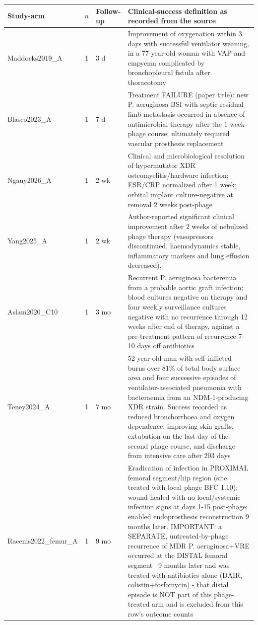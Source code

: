 \begin{tabular}{p{2.6cm}cp{1.5cm}p{8.4cm}}
\toprule
Study-arm & $n$ & Follow-up & Clinical-success definition as recorded from the source \\
\midrule
Maddocks2019\_A & 1 & 3 d & Improvement of oxygenation within 3 days with successful ventilator weaning, in a 77-year-old woman with VAP and empyema complicated by bronchopleural fistula after thoracotomy \\
Blasco2023\_A & 1 & 7 d & Treatment FAILURE (paper title): new P. aeruginosa BSI with septic residual limb metastasis occurred in absence of antimicrobial therapy after the 1-week phage course; ultimately required vascular prosthesis replacement \\
Ngauy2026\_A & 1 & 2 wk & Clinical and microbiological resolution of hypermutator XDR osteomyelitis/hardware infection; ESR/CRP normalized after 1 week; orbital implant culture-negative at removal 2 weeks post-phage \\
Yang2025\_A & 1 & 2 wk & Author-reported significant clinical improvement after 2 weeks of nebulized phage therapy (vasopressors discontinued, haemodynamics stable, inflammatory markers and lung effusion decreased). \\
Aslam2020\_C10 & 1 & 3 mo & Recurrent P. aeruginosa bacteremia from a probable aortic graft infection; blood cultures negative on therapy and four weekly surveillance cultures negative with no recurrence through 12 weeks after end of therapy, against a pre-treatment pattern of recurrence 7-10 days off antibiotics \\
Teney2024\_A & 1 & 7 mo & 52-year-old man with self-inflicted burns over 81\% of total body surface area and four successive episodes of ventilator-associated pneumonia with bacteraemia from an NDM-1-producing XDR strain. Success recorded as reduced bronchorrhoea and oxygen dependence, improving skin grafts, extubation on the last day of the second phage course, and discharge from intensive care after 203 days \\
Racenis2022\_femur\_A & 1 & 9 mo & Eradication of infection in PROXIMAL femoral segment/hip region (site treated with local phage BFC 1.10); wound healed with no local/systemic infection signs at days 1-15 post-phage; enabled endoprosthesis reconstruction 9 months later. IMPORTANT: a SEPARATE, untreated-by-phage recurrence of MDR P. aeruginosa+VRE occurred at the DISTAL femoral segment ~9 months later and was treated with antibiotics alone (DAIR, colistin+fosfomycin) - that distal episode is NOT part of this phage-treated arm and is excluded from this row's outcome counts \\

\end{tabular}
